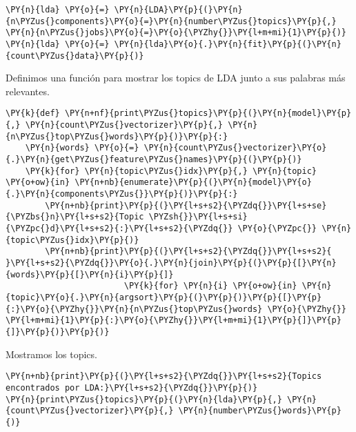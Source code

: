     \begin{tcolorbox}[breakable, size=fbox, boxrule=1pt, pad at break*=1mm,colback=cellbackground, colframe=cellborder]
\begin{Verbatim}[commandchars=\\\{\}]
\PY{n}{lda} \PY{o}{=} \PY{n}{LDA}\PY{p}{(}\PY{n}{n\PYZus{}components}\PY{o}{=}\PY{n}{number\PYZus{}topics}\PY{p}{,} \PY{n}{n\PYZus{}jobs}\PY{o}{=}\PY{o}{\PYZhy{}}\PY{l+m+mi}{1}\PY{p}{)}
\PY{n}{lda} \PY{o}{=} \PY{n}{lda}\PY{o}{.}\PY{n}{fit}\PY{p}{(}\PY{n}{count\PYZus{}data}\PY{p}{)}
\end{Verbatim}
\end{tcolorbox}
Definimos una función para mostrar los topics de LDA junto a sus palabras más relevantes.
    \begin{tcolorbox}[breakable, size=fbox, boxrule=1pt, pad at break*=1mm,colback=cellbackground, colframe=cellborder]
\begin{Verbatim}[commandchars=\\\{\}]
\PY{k}{def} \PY{n+nf}{print\PYZus{}topics}\PY{p}{(}\PY{n}{model}\PY{p}{,} \PY{n}{count\PYZus{}vectorizer}\PY{p}{,} \PY{n}{n\PYZus{}top\PYZus{}words}\PY{p}{)}\PY{p}{:}
    \PY{n}{words} \PY{o}{=} \PY{n}{count\PYZus{}vectorizer}\PY{o}{.}\PY{n}{get\PYZus{}feature\PYZus{}names}\PY{p}{(}\PY{p}{)}
    \PY{k}{for} \PY{n}{topic\PYZus{}idx}\PY{p}{,} \PY{n}{topic} \PY{o+ow}{in} \PY{n+nb}{enumerate}\PY{p}{(}\PY{n}{model}\PY{o}{.}\PY{n}{components\PYZus{}}\PY{p}{)}\PY{p}{:}
        \PY{n+nb}{print}\PY{p}{(}\PY{l+s+s2}{\PYZdq{}}\PY{l+s+se}{\PYZbs{}n}\PY{l+s+s2}{Topic \PYZsh{}}\PY{l+s+si}{\PYZpc{}d}\PY{l+s+s2}{:}\PY{l+s+s2}{\PYZdq{}} \PY{o}{\PYZpc{}} \PY{n}{topic\PYZus{}idx}\PY{p}{)}
        \PY{n+nb}{print}\PY{p}{(}\PY{l+s+s2}{\PYZdq{}}\PY{l+s+s2}{ }\PY{l+s+s2}{\PYZdq{}}\PY{o}{.}\PY{n}{join}\PY{p}{(}\PY{p}{[}\PY{n}{words}\PY{p}{[}\PY{n}{i}\PY{p}{]}
                        \PY{k}{for} \PY{n}{i} \PY{o+ow}{in} \PY{n}{topic}\PY{o}{.}\PY{n}{argsort}\PY{p}{(}\PY{p}{)}\PY{p}{[}\PY{p}{:}\PY{o}{\PYZhy{}}\PY{n}{n\PYZus{}top\PYZus{}words} \PY{o}{\PYZhy{}} \PY{l+m+mi}{1}\PY{p}{:}\PY{o}{\PYZhy{}}\PY{l+m+mi}{1}\PY{p}{]}\PY{p}{]}\PY{p}{)}\PY{p}{)}
\end{Verbatim}
\end{tcolorbox}

    Mostramos los topics.

    \begin{tcolorbox}[breakable, size=fbox, boxrule=1pt, pad at break*=1mm,colback=cellbackground, colframe=cellborder]
\begin{Verbatim}[commandchars=\\\{\}]
\PY{n+nb}{print}\PY{p}{(}\PY{l+s+s2}{\PYZdq{}}\PY{l+s+s2}{Topics encontrados por LDA:}\PY{l+s+s2}{\PYZdq{}}\PY{p}{)}
\PY{n}{print\PYZus{}topics}\PY{p}{(}\PY{n}{lda}\PY{p}{,} \PY{n}{count\PYZus{}vectorizer}\PY{p}{,} \PY{n}{number\PYZus{}words}\PY{p}{)}
\end{Verbatim}
\end{tcolorbox}

